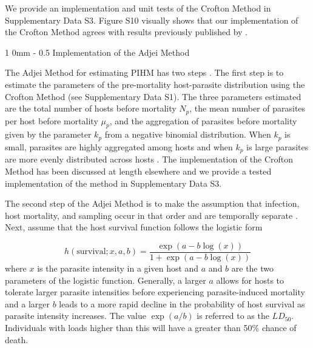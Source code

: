 \documentclass[12pt, a4paper]{article}
\makeatletter
\renewcommand{\section}{\@startsection
{section}%
{1}%
{0mm}%
{-\baselineskip}%
{0.5\baselineskip}%
{\normalfont\bf\large}} %
\makeatother
\begin{document}
We provide an implementation and unit tests of the Crofton Method in  Supplementary Data S3.  Figure S10 visually shows that our implementation of the Crofton Method agrees with results previously published by \cite{Crofton1971a}.

\section{Implementation of the Adjei Method}

The Adjei Method for estimating PIHM has two steps \citep{Adjei1986}.  The first
step is to estimate the parameters of the pre-mortality host-parasite
distribution using the Crofton Method (see Supplementary Data S1).  The three parameters estimated are the
total number of hosts before mortality $N_p$,  the mean number of parasites per
host before mortality $\mu_p$, and the aggregation of parasites before
mortality given by the parameter $k_p$ from a negative binomial distribution.
When $k_p$ is small, parasites are highly aggregated among hosts and when
$k_p$ is large parasites are more evenly distributed across hosts \citep{Wilson2002}.  The implementation of the Crofton Method has been discussed at length elsewhere \citep[e.g.][ and in Supplementary Data S1]{Royce1990,Lester1984} and we provide a tested implementation of the method in Supplementary Data S3.

The second step of the Adjei Method is to make the assumption that infection, host mortality, and sampling occur in that order and are temporally separate \citep{Adjei1986}. Next, \citeauthor{Adjei1986} assume that the host survival function follows the logistic form

\begin{equation}
    h(\text{survival}; x, a, b) = \dfrac{\exp{(a - b \log(x))}}{1 + \exp{(a - b \log(x))}}
    \label{eq:logistic}
\end{equation}
where $x$ is the parasite intensity in a given host and $a$ and $b$ are the two
parameters of the logistic function. Generally, a larger $a$ allows for hosts to
tolerate larger parasite intensities before experiencing parasite-induced mortality
and a larger $b$ leads to a more rapid decline in the probability of host
survival as parasite intensity increases. The value $\exp(a / b)$ is referred
to as the $LD_{50}$. Individuals with loads higher than this will have a greater than 50\% chance of death.
\end{document}
